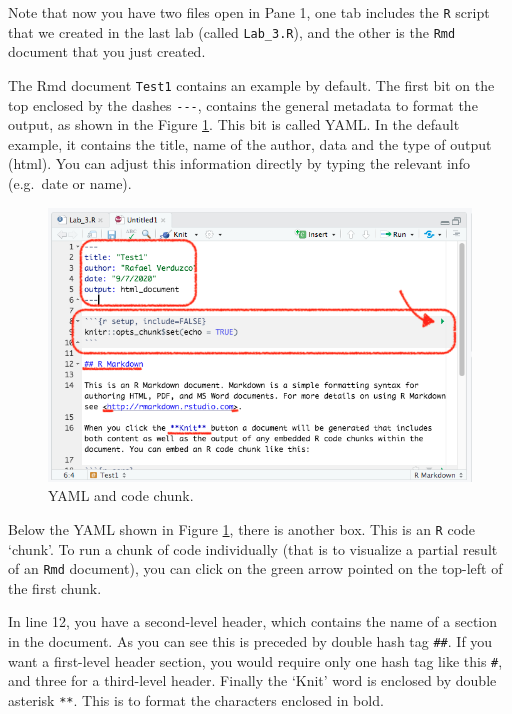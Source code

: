 \documentclass[
]{book}
\begin{document}
Note that now you have two files open in Pane 1, one tab includes the \texttt{R} script that we created in the last lab (called \texttt{Lab\_3.R}), and the other is the \texttt{Rmd} document that you just created.

The Rmd document \texttt{Test1} contains an example by default. The first bit on the top enclosed by the dashes \texttt{-\/-\/-}, contains the general metadata to format the output, as shown in the Figure \ref{fig:yaml-chunk}. This bit is called YAML. In the default example, it contains the title, name of the author, data and the type of output (html). You can adjust this information directly by typing the relevant info (e.g.~date or name).

\begin{figure}

\includegraphics[width=1\linewidth]{./images/lab4_rmd_view_2} \hfill{}

\caption{YAML and code chunk.}\label{fig:yaml-chunk}
\end{figure}

Below the YAML shown in Figure \ref{fig:yaml-chunk}, there is another box. This is an \texttt{R} code `chunk'. To run a chunk of code individually (that is to visualize a partial result of an \texttt{Rmd} document), you can click on the green arrow pointed on the top-left of the first chunk.

In line 12, you have a second-level header, which contains the name of a section in the document. As you can see this is preceded by double hash tag \texttt{\#\#}. If you want a first-level header section, you would require only one hash tag like this \texttt{\#}, and three for a third-level header. Finally the `Knit' word is enclosed by double asterisk \texttt{**}. This is to format the characters enclosed in bold.
\end{document}
